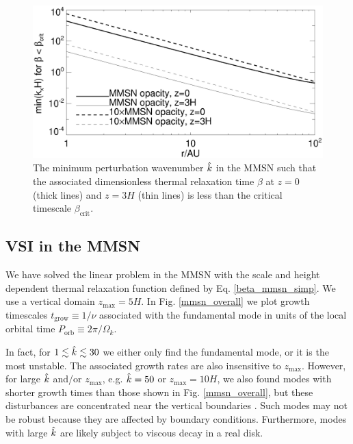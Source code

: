 
\begin{figure}
  \includegraphics[width=\linewidth]{figures/bcrit_mink} 
  \caption{The minimum perturbation wavenumber $\hat{k}$ in
    the MMSN such that the associated dimensionless thermal
    relaxation time  $\beta$ at $z=0$ (thick lines) and $z=3H$ (thin
    lines) is less than the critical timescale $\beta_\mathrm{crit}$.  
    \label{mmsn_bcrit_bcool_mink}}   
\end{figure}  


\subsection{VSI in the MMSN}
We have solved the linear problem in the MMSN with the scale and
height dependent thermal relaxation function defined by
Eq. \ref{beta_mmsn_simp}.  We use a vertical
domain $z_\mathrm{max}=5H$. In Fig. \ref{mmsn_overall} we plot growth
timescales $t_\mathrm{grow} \equiv 1/\nu$ associated with the
fundamental mode in units of the local orbital time
$P_\mathrm{orb}\equiv 2\pi/\Omega_k$.    

In fact, for $1\lesssim \hat{k} \lesssim 30$ we either only find the
fundamental mode, or it is the most unstable. The associated 
growth rates are also insensitive to $z_\mathrm{max}$. However, for
large $\hat{k}$ and/or $z_\mathrm{max}$, e.g. $\hat{k}=50$ or 
$z_\mathrm{max}=10H$, we also found modes with shorter growth times 
than those shown in Fig. \ref{mmsn_overall}, but these disturbances are 
concentrated near the vertical boundaries
\citep{nelson13,mcnally14}. Such modes may not be robust because    
they are affected by boundary conditions. Furthermore, modes with   
large $\hat{k}$ are likely subject to viscous decay in a real disk.  

